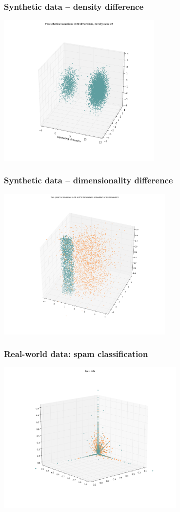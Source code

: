 \documentclass{beamer}
\begin{document}
\begin{frame}
\frametitle{Synthetic data -- density difference}
\centering
\includegraphics[height=3in]{./fig/gaussian_illustration.png}
\end{frame}

\begin{frame}
\frametitle{Synthetic data -- dimensionality difference}
\centering
\includegraphics[height=3in]{./fig/priya_illustration.png}
\end{frame}

\begin{frame}
\frametitle{Real-world data: spam classification}
\centering
\includegraphics[height=3in]{./fig/spam_illustration.png}
\end{frame}
\end{document}
